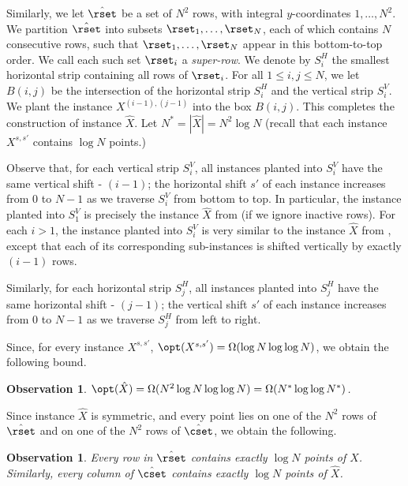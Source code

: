 \documentclass{toc}
\newtheorem{myobs}[theorem]{Observation}
\begin{document}
Similarly, we let $\hat \rset$ be a set of $N^2$ rows, with integral $y$-coordinates $1,\ldots,N^2$. We partition $\hat \rset$ into subsets $\rset_1,\ldots,\rset_N$, each of which contains $N$ consecutive rows, such that $\rset_1,\ldots,\rset_N$ appear in this bottom-to-top order. We call each such set $\rset_i$ a \emph{super-row}.  We denote by $S^H_i$ the smallest horizontal strip containing all rows of $\rset_i$.
For all $1\leq i,j\leq N$, we let $B(i,j)$ be the intersection of the horizontal strip $S^H_i$ and the vertical strip $S^V_i$. We plant the instance $X^{(i-1),(j-1)}$ into the box $B(i,j)$. 
This completes the construction of instance $\hat{X}$. 
Let $N^* = |\hat{X}| = N^2 \log N$ (recall that  each instance $X^{s,s'}$ contains $\log N$ points.) 


Observe that, for each vertical strip $S^V_i$, all instances planted into $S^V_i$ have the same vertical shift - $(i-1)$; the horizontal shift $s'$ of each instance increases from $0$ to $N-1$ as we traverse $S^V_i$ from bottom to top. 
In particular, the instance planted into $S^V_1$ is precisely the instance $\hat X$ from  (if we ignore inactive rows).  
For each $i>1$, the instance planted into $S^V_i$ is very similar to the instance  $\hat X$ from , except that each of its corresponding sub-instances is shifted vertically by exactly $(i-1)$ rows.

Similarly, for each horizontal strip  $S^H_j$, all instances planted into $S^H_j$ have the same horizontal shift - $(j-1)$; the vertical shift $s'$ of each instance increases from $0$ to $N-1$ as we traverse $S^H_j$ from left to right.


Since, for every  instance $X^{s,s'}$, $\opt(X^{s,s'})=\Omega(\log N\log\log N)$, we obtain the following bound.
%
\begin{myobs} 
 $\opt(\hat X)=\Omega(N^2\log N\log\log N)=\Omega(N^*\log\log N^*)$. 
\end{myobs} 

Since instance $\hat X$ is symmetric, and every point lies on one of the $N^2$ rows of $\hat\rset$ and on one of the $N^2$ rows of $\hat\cset$, we obtain the following.

\begin{myobs} 
Every row in $\hat\rset$ contains exactly $\log N$ points of $\hat X$. Similarly, every column of $\hat\cset$  contains exactly $\log N$ points of $\hat X$.
\end{myobs} 
\end{document}
